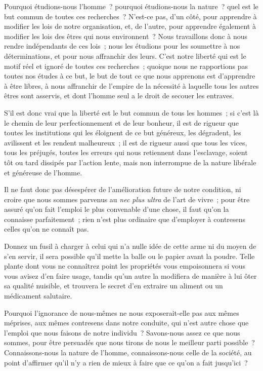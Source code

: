 \documentclass[french,twoside]{book} %
\begin{document}
Pourquoi étudions-nous l’homme ? pourquoi étudions-nous la nature ? quel est le but commun de toutes ces recherches ? N’est-ce pas, d’un côté, pour apprendre à modifier les lois de notre organisation, et, de l’autre, pour apprendre également à modifier les lois des êtres qui nous environnent ? Nous travaillons donc à nous rendre indépendants de ces lois ; nous les étudions pour les soumettre à nos déterminations, et pour nous affranchir des leurs. C’est notre liberté qui est le motif réel et ignoré de toutes ces recherches ; quoique nous ne rapportions pas toutes nos études à ce but, le but de tout ce que nous apprenons est d’apprendre à être libres, à nous affranchir de l’empire de la nécessité à laquelle tous les autres êtres sont asservis, et dont l’homme seul a le droit de secouer les entraves.\par
S’il est donc vrai que la liberté est le but commun de tous les hommes ; si c’est là le chemin de leur perfectionnement et de leur bonheur, il est de rigueur que toutes les institutions qui les éloignent de ce but généreux, les dégradent, les avilissent et les rendent malheureux ; il est de rigueur aussi que tous les vices, tous les préjugés, toutes les erreurs qui nous retiennent dans l’esclavage, soient tôt ou tard dissipés par l’action lente, mais non interrompue de la nature libérale et généreuse de l’homme.\par
Il ne faut donc pas désespérer de l’amélioration future de notre condition, ni croire que nous sommes parvenus au {\itshape nec plus ultra} de l’art de vivre ; pour être assuré qu’on fait l’emploi le plus convenable d’une chose, il faut qu’on la connaisse parfaitement ; rien n’est plus ordinaire que d’employer à contresens celles qu’on ne connaît pas.\par
Donnez un fusil à charger à celui qui n’a nulle idée de cette arme ni du moyen de s’en servir, il sera possible qu’il mette la balle ou le papier avant la poudre. Telle plante dont vous ne connaîtrez point les propriétés vous empoisonnera si vous vous avisez d’en faire usage, tandis qu’un autre la modifiera de manière à lui ôter sa qualité nuisible, et trouvera le secret d’en extraire un aliment ou un médicament salutaire.\par
Pourquoi l’ignorance de nous-mêmes ne nous exposerait-elle pas aux mêmes méprises, aux mêmes contresens dans notre conduite, qui n’est autre chose que l’emploi que nous faisons de notre individu ? Savons-nous assez ce que nous sommes, pour être persuadés que nous tirons de nous le meilleur parti possible ? Connaissons-nous la nature de l’homme, connaissons-nous celle de la société, au point d’affirmer qu’il n’y a rien de mieux à faire que ce qu’on a fait jusqu’ici ?\par
\end{document}
